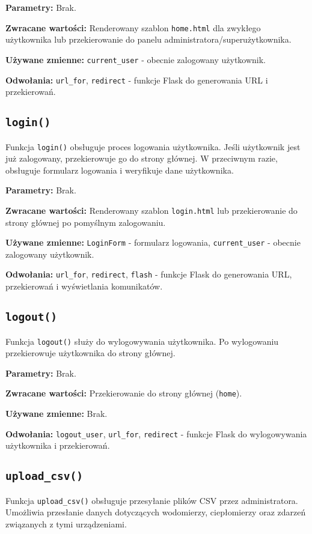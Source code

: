 \documentclass[12pt,a4paper]{report}
\begin{document}
\textbf{Parametry:} Brak.

\textbf{Zwracane wartości:} Renderowany szablon \texttt{home.html} dla zwykłego użytkownika lub przekierowanie do panelu administratora/superużytkownika.

\textbf{Używane zmienne:} \texttt{current\_user} - obecnie zalogowany użytkownik.

\textbf{Odwołania:} \texttt{url\_for}, \texttt{redirect} - funkcje Flask do generowania URL i przekierowań.

\subsection{\texttt{login()}}
\label{sec:login}
Funkcja \texttt{login()} obsługuje proces logowania użytkownika. Jeśli użytkownik jest już zalogowany, przekierowuje go do strony głównej. W przeciwnym razie, obsługuje formularz logowania i weryfikuje dane użytkownika.

\textbf{Parametry:} Brak.

\textbf{Zwracane wartości:} Renderowany szablon \texttt{login.html} lub przekierowanie do strony głównej po pomyślnym zalogowaniu.

\textbf{Używane zmienne:} \texttt{LoginForm} - formularz logowania, \texttt{current\_user} - obecnie zalogowany użytkownik.

\textbf{Odwołania:} \texttt{url\_for}, \texttt{redirect}, \texttt{flash} - funkcje Flask do generowania URL, przekierowań i wyświetlania komunikatów.

\subsection{\texttt{logout()}}
\label{sec:logout}
Funkcja \texttt{logout()} służy do wylogowywania użytkownika. Po wylogowaniu przekierowuje użytkownika do strony głównej.

\textbf{Parametry:} Brak.

\textbf{Zwracane wartości:} Przekierowanie do strony głównej (\texttt{home}).

\textbf{Używane zmienne:} Brak.

\textbf{Odwołania:} \texttt{logout\_user}, \texttt{url\_for}, \texttt{redirect} - funkcje Flask do wylogowywania użytkownika i przekierowań.

\subsection{\texttt{upload\_csv()}}
\label{sec:upload_csv}
Funkcja \texttt{upload\_csv()} obsługuje przesyłanie plików CSV przez administratora. Umożliwia przesłanie danych dotyczących wodomierzy, ciepłomierzy oraz zdarzeń związanych z tymi urządzeniami.
\end{document}

